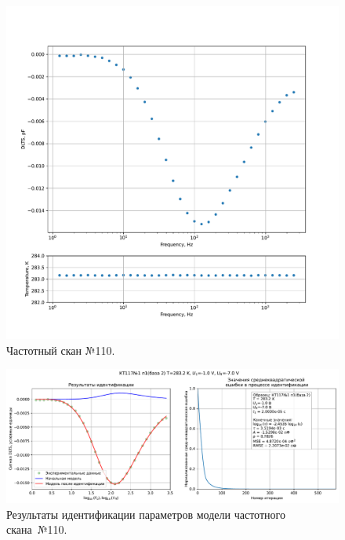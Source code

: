 \begin{figure}[!ht]
    \centering
    \includegraphics[width=1\textwidth]{../plots/КТ117№1_п1(база 2)_2500Гц-1Гц_1пФ_+10С_-1В-7В_200мВ_20мкс_шаг_0,1.pdf}
    \caption{Частотный скан №110.}
    \label{pic:frequency_scan_110}
\end{figure}

\begin{figure}[!ht]
    \centering
    \includegraphics[width=1\textwidth]{../plots/КТ117№1_п1(база 2)_2500Гц-1Гц_1пФ_+10С_-1В-7В_200мВ_20мкс_шаг_0,1_model.pdf}
    \caption{Результаты идентификации параметров модели частотного скана~№110.}
    \label{pic:frequency_scan_model110}
\end{figure}

\pagebreak



